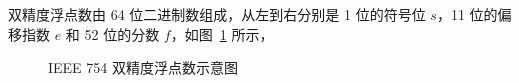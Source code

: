             双精度浮点数由 64 位二进制数组成，从左到右分别是 1 位的符号位 $s$，11 位的偏移指数 $e$ 和 52 位的分数 $f$，如图~\ref{fig:NumberSystemBasics/fixed-point-and-floating-point/ieee-754/basic-format/double} 所示，
            \begin{figure}
                \centering
                \caption{IEEE 754 双精度浮点数示意图}
                \label{fig:NumberSystemBasics/fixed-point-and-floating-point/ieee-754/basic-format/double}
            \end{figure}
